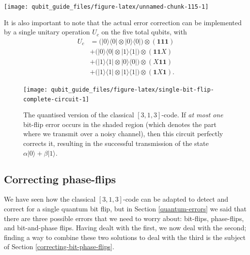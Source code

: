 \documentclass[fleqn,a4paper]{article}
\theoremstyle{definition}
\theoremstyle{definition}
\theoremstyle{definition}
\theoremstyle{definition}
\theoremstyle{remark}
\begin{document}
\begin{center}\texttt{[image: qubit\_guide\_files/figure-latex/unnamed-chunk-115-1]} \end{center}

It is also important to note that the actual error correction can be implemented by a single unitary operation \(U_c\) on the five total qubits, with
\[
  \begin{aligned}
    U_c
    &= \big(|0\rangle\langle 0|\otimes|0\rangle\langle 0|\big)\otimes(\mathbf{1}\mathbf{1}\mathbf{1})
  \\&+ \big(|0\rangle\langle 0|\otimes|1\rangle\langle 1|\big)\otimes(\mathbf{1}\mathbf{1}X)
  \\&+ \big(|1\rangle\langle 1|\otimes|0\rangle\langle 0|\big)\otimes(X\mathbf{1}\mathbf{1})
  \\&+ \big(|1\rangle\langle 1|\otimes|1\rangle\langle 1|\big)\otimes(\mathbf{1}X\mathbf{1}).
  \end{aligned}
\]



\begin{figure}[H]

{\centering \texttt{[image: qubit\_guide\_files/figure-latex/single-bit-flip-complete-circuit-1]} 

}

\caption{The quantised version of the classical \([3,1,3]\)-code. If \emph{at most one} bit-flip error occurs in the shaded region (which denotes the part where we transmit over a noisy channel), then this circuit perfectly corrects it, resulting in the successful transmission of the state \(\alpha|0\rangle+\beta|1\rangle\).}\label{fig:single-bit-flip-complete-circuit}
\end{figure}

\hypertarget{correcting-phase-flips}{%
\subsection{Correcting phase-flips}\label{correcting-phase-flips}}

We have seen how the classical \([3,1,3]\)-code can be adapted to detect and correct for a single quantum bit flip, but in Section \ref{quantum-errors} we said that there are three possible errors that we need to worry about: bit-flips, phase-flips, and bit-and-phase flips.
Having dealt with the first, we now deal with the second; finding a way to combine these two solutions to deal with the third is the subject of Section \ref{correcting-bit-phase-flips}.
\end{document}

